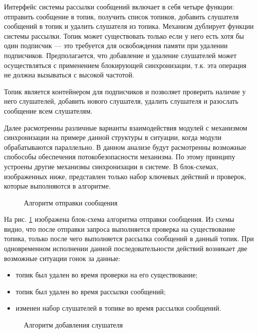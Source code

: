 Интерфейс системы рассылки сообщений включает в себя четыре функции: отправить сообщение в топик, получить список топиков, добавить слушателя сообщений в топик и удалить слушателя из топика. Механизм дублирует функции системы рассылки. Топик может существовать только если у него есть хотя бы один подписчик --- это требуется для освобождения памяти при удалении подписчиков. Предполагается, что добавление и удаление слушателей может осуществляться с применением блокирующей синхронизации, т.к. эта операция не должна вызываться с высокой частотой.

Топик является контейнером для подписчиков и позволяет проверить наличие у него слушателей, добавить нового слушателя, удалить слушателя и разослать сообщение всем слушателям.

Далее расмотренны различные варианты взаимодействия модулей с механизмом синхронизации на примере данной структуры в ситуации, когда модули обрабатываются параллельно. В данном анализе будут расмотренны возможные спобособы обеспечения потокобезопасности механизма. По этому принципу устроены другие механизмы синхронизации в системе. В блок-схемах, изображенных ниже, представлен только набор ключевых действий и проверок, которые выполняются в алгоритме. 

\begin{figure}[h]
	\caption{Алгоритм отправки сообщения}
	\label{im:2_2_5_send_message}
\end{figure}

На рис. \ref{im:2_2_5_send_message} изображена блок-схема алгоритма отправки сообщения. Из схемы видно, что после отправки запроса выполняется проверка на существование топика, только после чего выполняется рассылка сообщений в данный топик. При одновременном исполнении данной последовательности  действий возникает две возможные ситуации гонок за данные:

\begin{itemize}  
	\item топик был удален во время проверки на его существование;
	\item топик был удален во время рассылки сообщений;
	\item изменен набор слушателей в топике во время рассылки сообщений.
\end{itemize}

\begin{figure}[h]
	\caption{Алгоритм добавления слушателя}
	\label{im:2_2_4_add_listener}
\end{figure}


